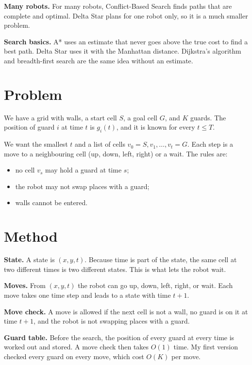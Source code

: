 \documentclass[10pt,letterpaper]{article}
\begin{document}
\textbf{Many robots.} For many robots, Conflict-Based Search \cite{sharon2015} finds paths that are complete and optimal. Delta Star plans for one robot only, so it is a much smaller problem.

\textbf{Search basics.} A* \cite{hart1968} uses an estimate that never goes above the true cost to find a best path. Delta Star uses it with the Manhattan distance. Dijkstra's algorithm \cite{dijkstra1959} and breadth-first search are the same idea without an estimate.

\section{Problem}

We have a grid with walls, a start cell $S$, a goal cell $G$, and $K$ guards. The position of guard $i$ at time $t$ is $g_i(t)$, and it is known for every $t \le T$.

We want the smallest $t$ and a list of cells $v_0 = S, v_1, \dots, v_t = G$. Each step is a move to a neighbouring cell (up, down, left, right) or a wait. The rules are:
\begin{itemize}\setlength{\itemsep}{0pt}\setlength{\topsep}{2pt}
\item no cell $v_s$ may hold a guard at time $s$;
\item the robot may not swap places with a guard;
\item walls cannot be entered.
\end{itemize}

\section{Method}

\textbf{State.} A state is $(x, y, t)$. Because time is part of the state, the same cell at two different times is two different states. This is what lets the robot wait.

\textbf{Moves.} From $(x, y, t)$ the robot can go up, down, left, right, or wait. Each move takes one time step and leads to a state with time $t + 1$.

\textbf{Move check.} A move is allowed if the next cell is not a wall, no guard is on it at time $t + 1$, and the robot is not swapping places with a guard.

\textbf{Guard table.} Before the search, the position of every guard at every time is worked out and stored. A move check then takes $O(1)$ time. My first version checked every guard on every move, which cost $O(K)$ per move.
\end{document}
